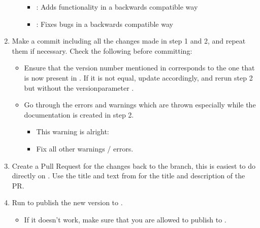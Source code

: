 \documentclass[a4paper,10pt,english]{sphinxmanual}
\begin{document}
\begin{enumerate}
\begin{itemize}
\begin{itemize}
\item {}
\sphinxAtStartPar
{}: Adds functionality in a backwards compatible way

\item {}
\sphinxAtStartPar
{}: Fixes bugs in a backwards compatible way

\end{itemize}

\end{itemize}

\item {}
\sphinxAtStartPar
Make a commit including all the changes made in step 1 and 2, and repeat them if necessary. Check the following before committing:
\begin{itemize}
\item {}
\sphinxAtStartPar
Ensure that the version number mentioned in  corresponds to the one that is now present in . If it is not equal, update  accordingly, and rerun step 2 but without the version\sphinxhyphen{}parameter .

\item {}
\sphinxAtStartPar
Go through the errors and warnings which are thrown especially while the documentation is created in step 2.
\begin{itemize}
\item {}
\sphinxAtStartPar
This warning is alright: 

\item {}
\sphinxAtStartPar
Fix all other warnings / errors.

\end{itemize}

\end{itemize}

\item {}
\sphinxAtStartPar
Create a Pull Request for the changes back to the \sphinxhyphen{}branch, this is easiest to do directly on . Use the title and text from  for the title and description of the PR.

\item {}
\sphinxAtStartPar
Run  to publish the new version to .
\begin{itemize}
\item {}
\sphinxAtStartPar
If it doesn’t work, make sure that you are allowed to publish to .


\end{itemize}
\end{enumerate}
\end{document}

